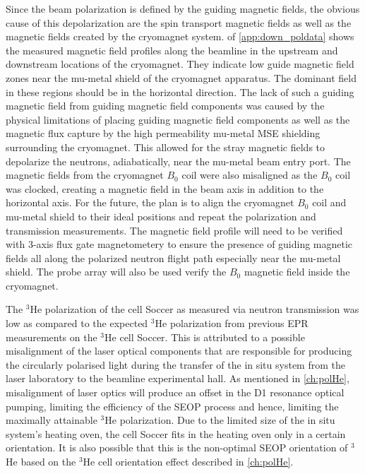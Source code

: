 Since the beam polarization is defined by the guiding magnetic fields, the obvious cause of this depolarization are the spin transport magnetic fields as well as the magnetic fields created by the cryomagnet system.  of \cref{app:down_poldata} shows the measured magnetic field profiles along the beamline in the upstream and downstream locations of the cryomagnet. They indicate low guide magnetic field zones near the mu-metal shield of the cryomagnet apparatus. The dominant field in these regions should be in the horizontal direction. The lack of such a guiding magnetic field from guiding magnetic field components was caused by the physical limitations of placing guiding magnetic field components as well as the magnetic flux capture by the high permeability mu-metal MSE shielding surrounding the cryomagnet. This allowed for the stray magnetic fields to depolarize the neutrons, adiabatically, near the mu-metal beam entry port. The magnetic fields from the cryomagnet $B_0$ coil were also misaligned as the $B_0$ coil was clocked, creating a magnetic field in the beam axis in addition to the horizontal axis. For the future, the plan is to align the cryomagnet $B_0$ coil and mu-metal shield to their ideal positions and repeat the polarization and transmission measurements. The magnetic field profile will need to be verified with 3-axis flux gate magnetometery to ensure the presence of guiding magnetic fields all along the polarized neutron flight path especially near the mu-metal shield. The probe array will also be used verify the $B_0$ magnetic field inside the cryomagnet. 

The $^3$He polarization of the cell Soccer as measured via neutron transmission was low as compared to the expected $^3$He polarization from previous EPR measurements on the $^3$He cell Soccer. This is attributed to a possible misalignment of the laser optical components that are responsible for producing the circularly polarised light during the transfer of the in situ system from the laser laboratory to the beamline experimental hall. As mentioned in \cref{ch:polHe}, misalignment of laser optics will produce an offset in the D1 resonance optical pumping, limiting the efficiency of the SEOP process and hence, limiting the maximally attainable $^3$He polarization. Due to the limited size of the in situ system's heating oven, the cell Soccer fits in the heating oven only in a certain orientation. It is also possible that this is the non-optimal SEOP orientation of $^3$He based on the $^3$He cell orientation effect described in \cref{ch:polHe}. 

